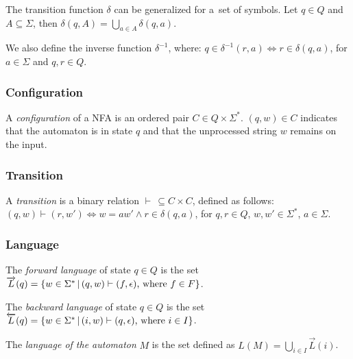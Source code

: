        The transition function $\delta$ can be generalized for a~set of symbols. Let $q \in Q$ and $A \subseteq \Sigma$, then $\delta(q, A) = \bigcup_{a\in A} \delta(q, a)$.

        We also define the inverse function $\delta^{-1}$, where: $q \in \delta^{-1}(r, a) \iff r \in \delta(q, a)$, for $a \in \Sigma$ and $q, r \in Q$.

        \subsubsection*{Configuration}
            A \textit{configuration} of a NFA is an ordered pair $C \in Q \times \Sigma^*$. $(q, w) \in C$ indicates that the automaton is in state $q$ and that the unprocessed string $w$ remains on the input.

        \subsubsection*{Transition}
            A \textit{transition} is a binary relation $\vdash\, \subseteq C \times C$, defined as follows: $(q, w) \vdash (r, w') \iff w = aw' \land r \in \delta(q, a)$, for $q, r \in Q$, $w, w' \in \Sigma^*$, $a \in \Sigma$.

        \subsubsection*{Language}
            The \textit{forward language} of state $q \in Q$ is the set $\overrightarrow L(q) = \{w \in \Sigma^*\,|\, (q, w) \vdash (f, \epsilon)\textnormal{, where }f \in F\}$.

            The \textit{backward language} of state $q \in Q$ is the set $\overleftarrow L(q) = \{w \in \Sigma^*\, |\, (i, w) \vdash (q, \epsilon)\textnormal{, where }i \in I\}$.

            The \textit{language of the automaton} $M$ is the set defined as $L(M)=\bigcup_{i \in I} \overrightarrow L(i)$.


